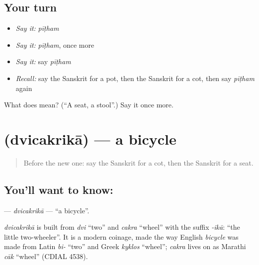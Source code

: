 \subsection*{Your turn}
\begin{itemize}
\raggedright
  \item \emph{Say it:} \emph{pīṭham}
  \item \emph{Say it:} \emph{pīṭham}, once more
  \item \emph{Say it:} say \emph{pīṭham}
  \item \emph{Recall:} say the Sanskrit for a pot, then the Sanskrit for a cot, then say \emph{pīṭham} again
\end{itemize}

\begin{tcolorbox}[breakable,colback=teal!4,colframe=teal!35!black,title={Before you move on}]
What does  mean? (\textquotedblleft{}A seat, a stool\textquotedblright{}.) Say it once more.
\end{tcolorbox}
\section[\texorpdfstring{\sk{द्विचक्रिका} (dvicakrikā)}{द्विचक्रिका (dvicakrikā)}]{ (dvicakrikā) — a bicycle}

\label{lesson:SA-C123-dvicakrika}



\begin{quote}
Before the new one: say the Sanskrit for a cot, then the Sanskrit for a seat.
\end{quote}

\subsection*{You'll want to know: }
\textbf{} — \emph{dvicakrikā} — \textquotedblleft{}a bicycle\textquotedblright{}.

\begin{cousinweb}
\emph{dvicakrikā} is built from \emph{dvi} \textquotedblleft{}two\textquotedblright{} and \emph{cakra} \textquotedblleft{}wheel\textquotedblright{} with the suffix \emph{-ikā}: \textquotedblleft{}the little two-wheeler\textquotedblright{}. It is a modern coinage, made the way English \emph{bicycle} was made from Latin \emph{bi-} \textquotedblleft{}two\textquotedblright{} and Greek \emph{kyklos} \textquotedblleft{}wheel\textquotedblright{}; \emph{cakra} lives on as Marathi \emph{cāk} \textquotedblleft{}wheel\textquotedblright{} (CDIAL 4538).
\end{cousinweb}

